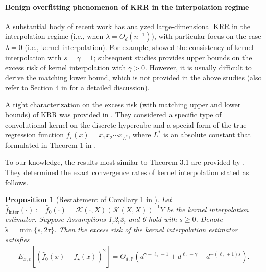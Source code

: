 \documentclass{article}
\theoremstyle{plain}
\newtheorem{proposition}[theorem]{Proposition}
\theoremstyle{definition}
\theoremstyle{remark}
\begin{document}
\begin{appendix}
\paragraph*{Benign overfitting phenomenon of KRR in the interpolation regime}


A substantial body of recent work has analyzed large-dimensional KRR in the interpolation regime (i.e., when $\lambda=O_d(n^{-1})$), with particular focus on the case $\lambda=0$ (i.e., kernel interpolation). 
For example, \cite{Liang_Just_2019} showed the consistency of kernel interpolation with $s=\gamma=1$; subsequent studies \cite{liang2020multiple, barzilai2023generalization} provides upper bounds on the excess risk of kernel interpolation with $\gamma >0$. However, it is usually difficult to derive the matching lower bound, which is not provided in the above studies (also refer to Section 4 in \cite{zhang2024phase} for a detailed discussion).


A tight characterization on the excess risk  (with matching upper and lower bounds) of KRR was provided in \cite{aerni2023strong}. They considered a specific type of convolutional kernel on the discrete hypercube and a special form of the true regression function $f_{\star}(x) = x_{1}x_{2}\cdots x_{L^{*}}$, where $L^{*}$ is an absolute constant that formulated in Theorem 1 in \cite{aerni2023strong}. 






To our knowledge, the results most similar to Theorem 3.1 are provided by \cite{zhang2024phase}. They determined the exact convergence rates of kernel interpolation stated as follows. 

\begin{proposition}[Restatement of Corollary 1 in \cite{zhang2024phase}]\label{prop_intepolation}
Let $\hat{f}_{\mathrm{inter}}(\cdot):= \hat{f}_{0}(\cdot) = \mathscr{K}(\cdot, X) \left(\mathscr{K}(X, X)\right)^{-1} Y$ be the kernel interpolation estimator.
  Suppose Assumptions 1,2,3, and 6 hold with $s \geq 0$. 
Denote $\tilde{s}=\min\{s, 2\tau\}$.
  Then the excess risk of the kernel interpolation estimator satisfies
\begin{align*}
E_{x, \epsilon} \left[ \left(\hat{f}_{0}(x) - f_{\star}(x) \right)^{2} \right]
=
\Theta_{d, \mathbb{P}} \left( 
d^{\gamma - \ell_{\gamma} - 1}
+ d^{\ell_{\gamma} - \gamma}
+ d^{-(\ell_{\gamma} + 1)  s}
\right).
\end{align*}
\end{proposition}



\end{appendix}
\end{document}
